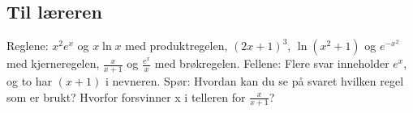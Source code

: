 \documentclass[11pt,a4paper]{article}
\begin{document}
\subsection*{Til læreren}
Reglene: $x^2 e^x$ og $x \ln x$ med produktregelen, $(2x + 1)^3$, $\ln(x^2 + 1)$ og $e^{-x^2}$ med kjerneregelen, $\frac{x}{x + 1}$ og $\frac{e^x}{x}$ med brøkregelen. Fellene: Flere svar inneholder $e^x$, og to har $(x + 1)$ i nevneren. Spør: Hvordan kan du se på svaret hvilken regel som er brukt? Hvorfor forsvinner x i telleren for $\frac{x}{x + 1}$?
\end{document}
